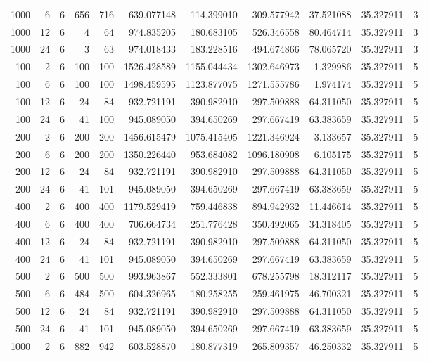 \begin{table}
\begin{tabular}{rrrrrrrrrrr}
1000 & 6 & 6 & 656 & 716 & 639.077148 & 114.399010 & 309.577942 & 37.521088 & 35.327911 & 3 \\
1000 & 12 & 6 & 4 & 64 & 974.835205 & 180.683105 & 526.346558 & 80.464714 & 35.327911 & 3 \\
1000 & 24 & 6 & 3 & 63 & 974.018433 & 183.228516 & 494.674866 & 78.065720 & 35.327911 & 3 \\
100 & 2 & 6 & 100 & 100 & 1526.428589 & 1155.044434 & 1302.646973 & 1.329986 & 35.327911 & 5 \\
100 & 6 & 6 & 100 & 100 & 1498.459595 & 1123.877075 & 1271.555786 & 1.974174 & 35.327911 & 5 \\
100 & 12 & 6 & 24 & 84 & 932.721191 & 390.982910 & 297.509888 & 64.311050 & 35.327911 & 5 \\
100 & 24 & 6 & 41 & 100 & 945.089050 & 394.650269 & 297.667419 & 63.383659 & 35.327911 & 5 \\
200 & 2 & 6 & 200 & 200 & 1456.615479 & 1075.415405 & 1221.346924 & 3.133657 & 35.327911 & 5 \\
200 & 6 & 6 & 200 & 200 & 1350.226440 & 953.684082 & 1096.180908 & 6.105175 & 35.327911 & 5 \\
200 & 12 & 6 & 24 & 84 & 932.721191 & 390.982910 & 297.509888 & 64.311050 & 35.327911 & 5 \\
200 & 24 & 6 & 41 & 101 & 945.089050 & 394.650269 & 297.667419 & 63.383659 & 35.327911 & 5 \\
400 & 2 & 6 & 400 & 400 & 1179.529419 & 759.446838 & 894.942932 & 11.446614 & 35.327911 & 5 \\
400 & 6 & 6 & 400 & 400 & 706.664734 & 251.776428 & 350.492065 & 34.318405 & 35.327911 & 5 \\
400 & 12 & 6 & 24 & 84 & 932.721191 & 390.982910 & 297.509888 & 64.311050 & 35.327911 & 5 \\
400 & 24 & 6 & 41 & 101 & 945.089050 & 394.650269 & 297.667419 & 63.383659 & 35.327911 & 5 \\
500 & 2 & 6 & 500 & 500 & 993.963867 & 552.333801 & 678.255798 & 18.312117 & 35.327911 & 5 \\
500 & 6 & 6 & 484 & 500 & 604.326965 & 180.258255 & 259.461975 & 46.700321 & 35.327911 & 5 \\
500 & 12 & 6 & 24 & 84 & 932.721191 & 390.982910 & 297.509888 & 64.311050 & 35.327911 & 5 \\
500 & 24 & 6 & 41 & 101 & 945.089050 & 394.650269 & 297.667419 & 63.383659 & 35.327911 & 5 \\
1000 & 2 & 6 & 882 & 942 & 603.528870 & 180.877319 & 265.809357 & 46.250332 & 35.327911 & 5 \\

\end{tabular}
\end{table}
